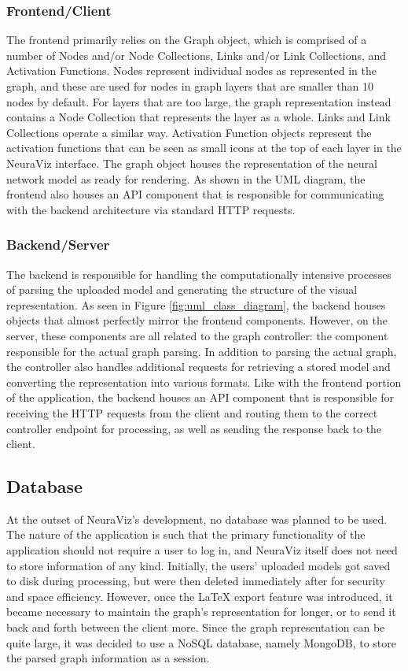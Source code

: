 \subsubsection{Frontend/Client}
The frontend primarily relies on the Graph object, which is comprised of a number of Nodes and/or Node Collections, Links and/or Link Collections, and Activation Functions. Nodes represent individual nodes as represented in the graph, and these are used for nodes in graph layers that are smaller than 10 nodes by default. For layers that are too large, the graph representation instead contains a Node Collection that represents the layer as a whole. Links and Link Collections operate a similar way. Activation Function objects represent the activation functions that can be seen as small icons at the top of each layer in the NeuraViz interface. The graph object houses the representation of the neural network model as ready for rendering. As shown in the UML diagram, the frontend also houses an API component that is responsible for communicating with the backend architecture via standard HTTP requests.

\subsubsection{Backend/Server}
The backend is responsible for handling the computationally intensive processes of parsing the uploaded model and generating the structure of the visual representation. As seen in Figure \ref{fig:uml_class_diagram}, the backend houses objects that almost perfectly mirror the frontend components. However, on the server, these components are all related to the graph controller: the component responsible for the actual graph parsing. In addition to parsing the actual graph, the controller also handles additional requests for retrieving a stored model and converting the representation into various formats. Like with the frontend portion of the application, the backend houses an API component that is responsible for receiving the HTTP requests from the client and routing them to the correct controller endpoint for processing, as well as sending the response back to the client.

\subsection{Database}
At the outset of NeuraViz's development, no database was planned to be used. The nature of the application is such that the primary functionality of the application should not require a user to log in, and NeuraViz itself does not need to store information of any kind. Initially, the users' uploaded models got saved to disk during processing, but were then deleted immediately after for security and space efficiency. However, once the LaTeX export feature was introduced, it became necessary to maintain the graph's representation for longer, or to send it back and forth between the client more. Since the graph representation can be quite large, it was decided to use a NoSQL database, namely MongoDB, to store the parsed graph information as a session.

